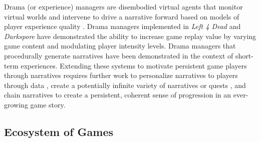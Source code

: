 \documentclass[conference]{IEEEtran}
\newcommand{\mytodo}[1]{\textbf{[[#1]]}}
\begin{document}
Drama (or experience) managers are disembodied virtual agents that monitor virtual worlds and intervene to drive a narrative forward based on models of player experience quality \cite{riedl2013:in-aimag}.
Drama managers implemented in {\em Left 4 Dead} and {\em Darkspore} have demonstrated the ability to increase game replay value by varying game content and modulating player intensity levels.
Drama managers that procedurally generate narratives have been demonstrated in the context of short-term experiences.
Extending these systems to motivate persistent game players through narratives requires further work to personalize narratives to players through data \cite{yu2012:prefix-based}, create a potentially infinite variety of narratives or quests \cite{li2012:crowdsource-narr-int}, and chain narratives to create a persistent, coherent sense of progression in an ever-growing game story.



\subsection{Ecosystem of Games}
\end{document}
